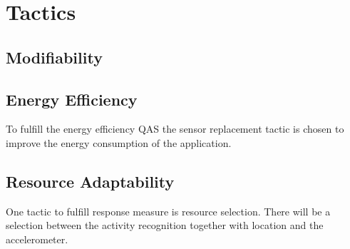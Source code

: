 \section{Tactics}

\subsection{Modifiability}
 \label{subsec:modifiability}
\subsection{Energy Efficiency}
To fulfill the energy efficiency QAS the sensor replacement tactic is chosen to improve the energy consumption of  the application.


\subsection{Resource Adaptability}
One tactic to fulfill response measure is resource selection. There will be a selection between the activity recognition together with location and the accelerometer. 

 